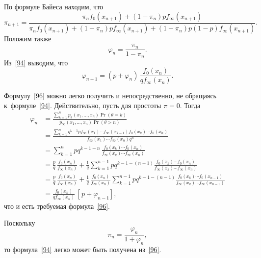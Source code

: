 По формуле Байеса находим, что
\begin{equation}
\label{94}%
\pi_{n+1}
    =\frac
    {\pi_n f_0(x_{n+1})+(1-\pi_n)pf_\infty(x_{n+1})}
    {\pi_n f_0(x_{n+1})
     +(1-\pi_n)pf_\infty(x_{n+1})
     +(1-\pi_n)p(1-p)f_\infty(x_{n+1})
    }.
\end{equation}
Положим также
\begin{equation}
\label{95}%
    \varphi_n=\frac{\pi_n}{1-\pi_n}.
\end{equation}
Из~\eqref{94} выводим, что
\begin{equation}
\label{96}%
    \varphi_{n+1}=(p+\varphi_n)\,\frac{f_0(x_n)}{qf_{\infty}(x_n)}.
\end{equation}

\begin{remark}\rm
Формулу~\eqref{96} можно легко получить и непосредственно, не
обращаясь к~формуле~\eqref{94}. Действительно, пусть для простоты
$\pi=0$. Тогда
\begin{align*}
\varphi_n
 &
    =\frac
      {\sum_{k=1}^np_k(x_1,\ldots,x_n)\Pr(\theta=k)}
      {p_{\infty}(x_1,\ldots,x_n)\Pr(\theta>n)}\\
 &
    =\frac
    {\sum_{k=1}^n
       q^{k-1}p
       f_{\infty}(x_1)\cdots f_{\infty}(x_{k-1})
       f_{0}(x_k)\cdots f_{0}(x_n)
    }
    {f_{\infty}(x_1)\cdots f_{\infty}(x_n)q^n}\\
 &
    =\sum_{k=1}^npq^{k-1-n}\,
     \frac{f_{0}(x_k)\cdots f_{0}(x_n)}{f_{\infty}(x_k)\cdots f_{\infty}(x_n)}\\
 &
    =\frac pq\,
    \frac{f_0(x_n)}{f_{\infty}(x_n)}
    +\frac1q
    \sum_{k=1}^{n-1}pq^{k-1-(n-1)}
    \frac{f_{0}(x_k)\cdots f_{0}(x_n)}{f_{\infty}(x_k)\cdots f_{\infty}(x_n)}\\
 &
    =\frac pq\,
    \frac{f_{0}(x_n)}{f_{\infty}(x_n)}
    +\frac1q\,
    \frac{f_0(x_n)}{f_{\infty}(x_n)}
    \sum_{k=1}^{n-1}pq^{k-1-(n-1)}
    \frac{f_{0}(x_k)\cdots f_{0}(x_{n-1})}{f_{\infty}(x_k)\cdots 
    f_{\infty}(x_{n-1})}\\
 &
    =\frac{f_0(x_n)}{qf_{\infty}(x_n)}\,
    [\hspace{1pt}p+\varphi_{n-1}],
\end{align*}
что и есть требуемая формула~\eqref{96}.
\end{remark}

Поскольку
\begin{equation}
\label{97}%
    \pi_n=\frac{\varphi_n}{1+\varphi_n},
\end{equation}
то формула~\eqref{94} легко может быть получена из~\eqref{96}.

